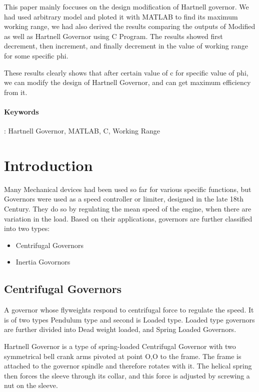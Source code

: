 \documentclass[15pt,a4paper,oneside]{article}
\begin{document}
	This paper mainly foccuses on the design modification of Hartnell governor. We had used arbitrary model and ploted it with MATLAB to find its maximum working range, we had also derived the results comparing the outputs of Modified as well as Hartnell Governor using C Program. The results showed first decrement, then increment, and finally decrement in the value of working range for some specific phi.
	
	These results clearly shows that after certain value of c for specific value of phi, we can modify the design of Hartnell Governor, and can get maximum efficiency from it.
	\paragraph*{Keywords}: Hartnell Governor, MATLAB, C, Working Range 
	\pagebreak
	
	\tableofcontents
	\thispagestyle{empty}
	\pagebreak
	
	\setcounter{page}{1}
	\section{Introduction}
	Many Mechanical devices had been used so far for various specific functions, but Governors were used as a speed controller or limiter, designed in the late 18th Century. They do so by regulating the mean speed of the engine, when there are variation in the load. Based on their applications, governors are further classified into two types:
	\begin{itemize}
		\item Centrifugal Governors
		\item Inertia Govornors
	\end{itemize}
	\subsection{Centrifugal Governors}
	A governor whose flyweights respond to centrifugal force to regulate the speed. It is of two types Pendulum type and second is Loaded type. Loaded type governors are further divided into Dead weight loaded, and Spring Loaded Governors. 
	
	Hartnell Governor is a type of spring-loaded Centrifugal Governor with two symmetrical bell crank arms pivoted at point O,O to the frame. The frame is attached to the governor spindle and therefore rotates with it. The helical spring then forces the sleeve through its collar, and this force is adjusted by screwing a nut on the sleeve.
\end{document}
